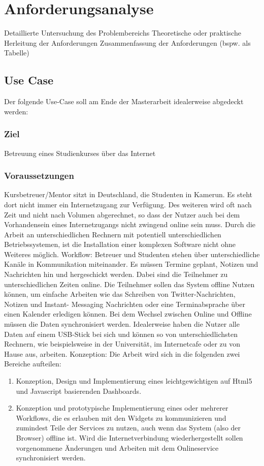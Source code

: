 \chapter{Anforderungsanalyse} 
\label{Kapitel 3}
Detaillierte Untersuchung des Problembereichs
Theoretische oder praktische Herleitung der Anforderungen
Zusammenfassung der Anforderungen (bspw. als Tabelle)

\section{Use Case}
Der folgende Use-Case soll am Ende der Masterarbeit idealerweise abgedeckt werden:

\subsection{Ziel}
Betreuung eines Studienkurses über das Internet

\subsection{Voraussetzungen}
Kursbetreuer/Mentor sitzt in Deutschland, die Studenten in Kamerun. Es steht dort nicht immer ein
Internetzugang zur Verfügung. Des weiteren wird oft nach Zeit und nicht nach Volumen
abgerechnet, so dass der Nutzer auch bei dem Vorhandensein eines Internetzugangs nicht zwingend
online sein muss. Durch die Arbeit an unterschiedlichen Rechnern mit potentiell unterschiedlichen
Betriebssystemen, ist die Installation einer komplexen Software nicht ohne Weiteres möglich.
Workflow:
Betreuer und Studenten stehen über unterschiedliche Kanäle in Kommunikation miteinander. Es
müssen Termine geplant, Notizen und Nachrichten hin und hergeschickt werden. Dabei sind die
Teilnehmer zu unterschiedlichen Zeiten online. Die Teilnehmer sollen das System offline Nutzen
können, um einfache Arbeiten wie das Schreiben von Twitter-Nachrichten, Notizen und Instant-
Messaging Nachrichten oder eine Terminabsprache über einen Kalender erledigen können. Bei dem
Wechsel zwischen Online und Offline müssen die Daten synchronisiert werden. Idealerweise haben
die Nutzer alle Daten auf einem USB-Stick bei sich und können so von unterschiedlichsten
Rechnern, wie beispielsweise in der Universität, im Internetcafe oder zu von Hause aus, arbeiten.
Konzeption:
Die Arbeit wird sich in die folgenden zwei Bereiche aufteilen:
\begin{enumerate}

\item Konzeption, Design und Implementierung eines leichtgewichtigen auf Html5 und Javascript
basierenden Dashboards.

\item Konzeption und prototypische Implementierung eines oder mehrerer Workflows, die es
erlauben mit den Widgets zu kommunizieren und zumindest Teile der Services zu nutzen,
auch wenn das System (also der Browser) offline ist. Wird die Internetverbindung
wiederhergestellt sollen vorgenommene Änderungen und Arbeiten mit dem Onlineservice
synchronisiert werden.

\end{enumerate}
